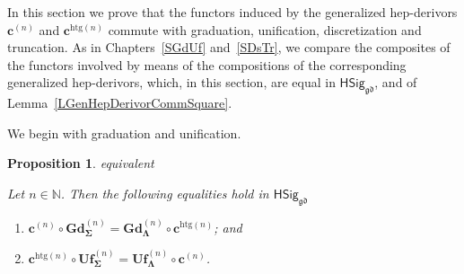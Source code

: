 \documentclass[a4paper, reqno]{amsbook}
\makeatletter
\newcommand{\sig}[1]{\mathbf{#1}}             %
\newcommand{\gd}{\mathfrak{gd}}              %
\newcommand{\htg}{\mathrm{htg}}                %
\newcommand{\bGd}{\mathbf{Gd}}
\newcommand{\bUf}{\mathbf{Uf}}
\theoremstyle{plain}
\newtheorem{proposition}[theorem]{Proposition}
\theoremstyle{definition}
\newcommand*{\CA@leanpending}{}
\newcommand*{\CA@leanrelation}{}
\newcommand*{\lean}[2]{%
  \ifcsname\string\color@lean@#1\endcsname\else
    \PackageError{main}{Unknown relation `#1' in \string\lean}{Use equivalent, weaker or stronger.}%
  \fi
  \gdef\CA@leanrelation{#1}%
  \gdef\CA@leanpending{#2}}
\makeatother
\begin{document}
In this section we prove that the functors induced by the generalized hep-derivors $\mathbf{c}^{(n)}$ and $\mathbf{c}^{\htg(n)}$ commute with graduation, unification, discretization and truncation.
As in Chapters~\ref{SGdUf} and~\ref{SDsTr}, we compare the composites of the functors involved by means of the compositions of the corresponding generalized hep-derivors, which, in this section, are equal in $\mathsf{HSig}_{\gd}$, and of Lemma~\ref{LGenHepDerivorCommSquare}.

We begin with graduation and unification.

\begin{proposition}\label{PChangeSigGdUf}\lean{equivalent}{ChangeOfSignature.graduation_comp,ChangeOfSignature.unification_comp}
Let $n\in\mathbb{N}$.
Then the following equalities hold in $\mathsf{HSig}_{\gd}$
\begin{enumerate}
	\item
	$\mathbf{c}^{(n)}\circ\bGd^{(n)}_{\sig{\Sigma}}=\bGd^{(n)}_{\sig{\Lambda}}\circ\mathbf{c}^{\htg(n)}$; and

	\item
	$\mathbf{c}^{\htg(n)}\circ\bUf^{(n)}_{\sig{\Sigma}}=\bUf^{(n)}_{\sig{\Lambda}}\circ\mathbf{c}^{(n)}$.
\end{enumerate}
\end{proposition}
\end{document}
